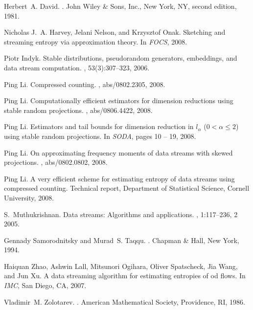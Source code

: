 \documentclass[oneside,10pt]{article}
\begin{document}
\appendix
{\small
\begin{thebibliography}{10}

Herbert~A. David.
.
\newblock John Wiley \& Sons, Inc., New York, NY, second edition, 1981.

Nicholas J.~A. Harvey, Jelani Nelson, and Krzysztof Onak.
\newblock Sketching and streaming entropy via approximation theory.
\newblock In {\em FOCS}, 2008.

Piotr Indyk.
\newblock Stable distributions, pseudorandom generators, embeddings, and data
  stream computation.
, 53(3):307--323, 2006.

Ping Li.
\newblock Compressed counting.
, abs/0802.2305, 2008.

Ping Li.
\newblock Computationally efficient estimators for dimension reductions using
  stable random projections.
, abs/0806.4422, 2008.

Ping Li.
\newblock Estimators and tail bounds for dimension reduction in $l_\alpha$
  ($0<\alpha\leq 2$) using stable random projections.
\newblock In {\em SODA}, pages 10 -- 19, 2008.

Ping Li.
\newblock On approximating frequency moments of data streams with skewed
  projections.
, abs/0802.0802, 2008.

Ping Li.
\newblock A very efficient scheme for estimating entropy of data streams using
  compressed counting.
\newblock Technical report, Department of Statistical Science, Cornell
  University, 2008.

S.~Muthukrishnan.
\newblock Data streams: Algorithms and applications.
,
  1:117--236, 2 2005.

Gennady Samorodnitsky and Murad~S. Taqqu.
.
\newblock Chapman \& Hall, New York, 1994.

Haiquan Zhao, Ashwin Lall, Mitsunori Ogihara, Oliver Spatscheck, Jia Wang, and
  Jun Xu.
\newblock A data streaming algorithm for estimating entropies of od flows.
\newblock In {\em IMC}, San Diego, CA, 2007.

Vladimir~M. Zolotarev.
.
\newblock American Mathematical Society, Providence, RI, 1986.

\end{thebibliography}

}
\end{document}
